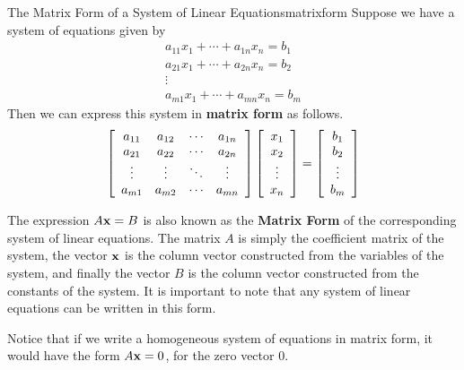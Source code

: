 \begin{definition}{The Matrix Form of a System of Linear Equations}{matrixform}
Suppose we have a system of equations given by
\begin{equation*}
\begin{array}{c}
a_{11}x_{1}+\cdots +a_{1n}x_{n}=b_{1} \\
a_{21}x_{1}+ \cdots + a_{2n}x_{n} = b_{2} \\
\vdots \\
a_{m1}x_{1}+\cdots +a_{mn}x_{n}=b_{m}
\end{array}
\end{equation*}
Then we can express this system in \textbf{matrix form}  as follows.
\begin{equation*}
\left[
\begin{array}{cccc}
a_{11} & a_{12} & \cdots & a_{1n} \\
a_{21} & a_{22} & \cdots & a_{2n} \\
\vdots & \vdots & \ddots & \vdots \\
a_{m1} & a_{m2} & \cdots & a_{mn}
\end{array}
\right]
\left[
\begin{array}{c}
x_{1} \\
x_{2} \\
\vdots \\
x_{n}
\end{array}
\right]
=
\left[
\begin{array}{c}
b_{1}\\
b_{2}\\
\vdots \\
b_{m}
\end{array}
\right]
\end{equation*}
 
\end{definition}

The expression $A\mathbf{x}=B$ is also known as the \textbf{Matrix Form} of the
corresponding system of linear equations.  The
matrix $A$ is simply the coefficient matrix of the system, the vector
$\mathbf{x}$ is the column vector constructed from the variables of the system,
and finally the vector $B$ is the column vector constructed from the constants
of the system.  It is important to note that any system of linear
equations can be written in this form.

Notice that if we write a homogeneous system of equations in matrix form, it would have the form
$A\mathbf{x}=0$, for the zero vector $0$.

